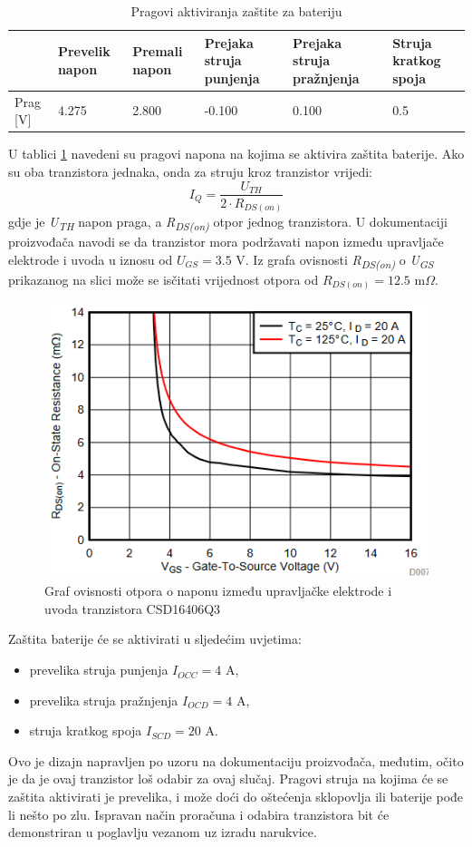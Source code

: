 \begin{table}[htbp]
    \centering
    \caption{Pragovi aktiviranja zaštite za bateriju \cite{ti:bq29700}}
    \begin{tabular}{|l|p{1.5cm}|p{1.5cm}|p{2.5cm}|p{2.5cm}|p{2.5cm}|} \hline
    \raggedright
    & Prevelik napon & Premali napon & Prejaka struja punjenja & Prejaka struja pražnjenja & Struja kratkog spoja \\
    \hline
    Prag [V] & 4.275 & 2.800 & -0.100 & 0.100 & 0.5 \\
    \hline
    \end{tabular}%
    \label{tab:BQ29700}%
\end{table}%
U tablici \ref{tab:BQ29700} navedeni su pragovi napona na kojima se aktivira zaštita baterije. Ako su oba tranzistora jednaka, onda za struju kroz tranzistor vrijedi:
\begin{equation} \label{eq:TRANCUR}
    I_Q = \frac{U_{TH}}{2\cdot R_{DS(on)}}
\end{equation}
gdje je \textit{U\textsubscript{TH}} napon praga, a \textit{R\textsubscript{DS(on)}} otpor jednog tranzistora. U dokumentaciji proizvođača navodi se da tranzistor mora podržavati napon između upravljače elektrode i uvoda u iznosu od $U_{GS}=3.5\textrm{ V}$. Iz grafa ovisnosti \textit{R\textsubscript{DS(on)}} o \textit{U\textsubscript{GS}} prikazanog na slici može se isčitati vrijednost otpora od $R_{DS(on)}=12.5\textrm{ m}\Omega$.
\begin{figure}[hbt]
    \centering
    \includegraphics[width=10 cm]{Figures/RDS_OLD.PNG}
    \caption{Graf ovisnosti otpora o naponu između upravljačke elektrode i uvoda tranzistora CSD16406Q3 \cite{ti:csd1640}}
    \label{slk:RDS_OLD}
\end{figure}
Zaštita baterije će se aktivirati u sljedećim uvjetima:
\begin{itemize}
    \item prevelika struja punjenja $I_{OCC}=4\textrm{ A}$,
    \item prevelika struja pražnjenja $I_{OCD}=4\textrm{ A}$,
    \item struja kratkog spoja $I_{SCD}=20\textrm{ A}$.
\end{itemize}
Ovo je dizajn napravljen po uzoru na dokumentaciju proizvođača, međutim, očito je da je ovaj tranzistor loš odabir za ovaj slučaj. Pragovi struja na kojima će se zaštita aktivirati je prevelika, i može doći do oštećenja sklopovlja ili baterije pođe li nešto po zlu. Ispravan način proračuna i odabira tranzistora bit će demonstriran u poglavlju vezanom uz izradu narukvice.

